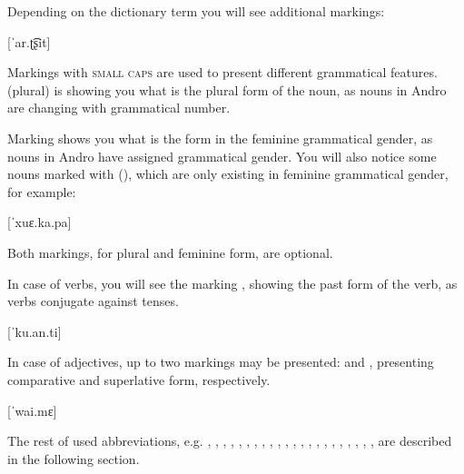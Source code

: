 \begin{spacing}{1.1}
Depending on the dictionary term you will see additional markings:

[ˈar.ʈ͡ʂit]
\skipline

Markings with \textsc{small caps} are used to present different grammatical
features. \Pl{} (plural) is showing you what is the plural form of the
noun, as nouns in Andro are changing with grammatical number.

Marking \Fem{} shows you what is the form in the feminine grammatical
gender, as nouns in Andro have assigned grammatical gender. You will also notice
some nouns marked with (\Fem{}), which are only existing in feminine
grammatical gender, for example:

[ˈxuɛ.ka.pa]
\skipline

Both markings, for plural and feminine form, are optional.

In case of verbs, you will see the marking \Pst{}, showing the past form
of the verb, as verbs conjugate against tenses.

[ˈku.an.ti]
\skipline

In case of adjectives, up to two markings may be presented: \Comp{} and
\Supl{}, presenting comparative and superlative form, respectively.

[ˈwai.mɛ]
\skipline

The rest of used abbreviations, e.g. \Dem{}, \Nan{}, \Rel{}, \Refl{}, \Tsg{},
\Ssg{}, \Tpl{}, \Fpl{}, \Fsg{}, \Poss{}, \Ins{}, \Emph{}, \Imp{}, \Acc{},
\Gen{}, \Dat{}, \Abl{}, \Loc{}, \Voc{}, \Nfrm{}, \Imp{}, \Cond{}, \Top{} are
described in the following section.

\skipline

\printglosses[style=list]

\end{spacing}
